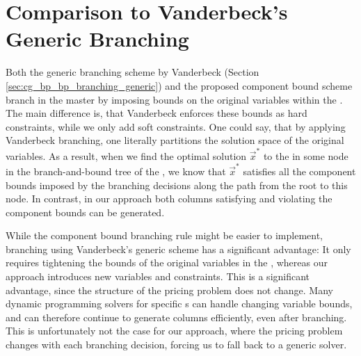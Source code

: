 \section{Comparison to Vanderbeck's Generic Branching}\label{sec:cmpbnd_simdif}
Both the generic branching scheme by Vanderbeck (Section \ref{sec:cg_bp_bp_branching_generic}) and the proposed component bound scheme branch in the master by imposing bounds on the original variables within the \SP{}. The main difference is, that Vanderbeck enforces these bounds as hard constraints, while we only add soft constraints. One could say, that by applying Vanderbeck branching, one literally partitions the solution space of the original variables. As a result, when we find the optimal solution $\vec{x}^*$ to the \IP{} in some node in the branch-and-bound tree of the \RMP{}, we know that $\vec{x}^*$ satisfies all the component bounds imposed by the branching decisions along the path from the root to this node. In contrast, in our approach both columns satisfying and violating the component bounds can be generated.

While the component bound branching rule might be easier to implement, branching using Vanderbeck's generic scheme has a significant advantage: It only requires tightening the bounds of the original variables in the \SP{}, whereas our approach introduces new variables and constraints. This is a significant advantage, since the structure of the pricing problem does not change. Many dynamic programming solvers for specific \IP{}s can handle changing variable bounds, and can therefore continue to generate columns efficiently, even after branching. This is unfortunately not the case for our approach, where the pricing problem changes with each branching decision, forcing us to fall back to a generic \IP{} solver.
